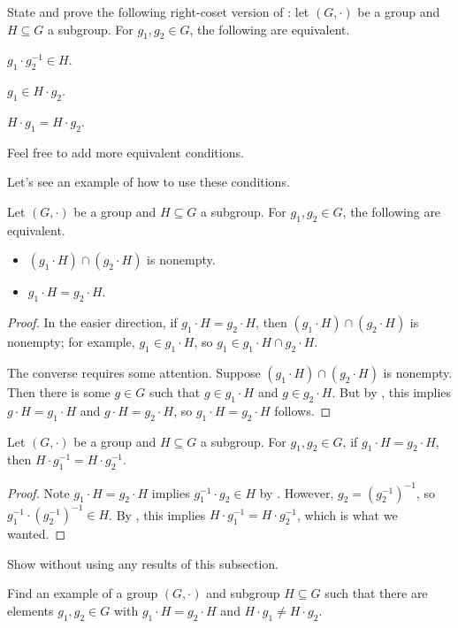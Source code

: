 \documentclass[../notes.tex]{subfiles}
\begin{document}
\begin{exe} \label{exe:how-to-right-coset}
    State and prove the following right-coset version of : let $(G,\cdot)$ be a group and $H\subseteq G$ a subgroup. For $g_1,g_2\in G$, the following are equivalent.
    \begin{listalph}
        \item $g_1\cdot g_2^{-1}\in H$.
        \item $g_1\in H\cdot g_2$.
        \item $H\cdot g_1=H\cdot g_2$.
    \end{listalph}
    Feel free to add more equivalent conditions.
\end{exe}
Let's see an example of how to use these conditions.
\begin{corollary} \label{cor:intersect-cosets}
    Let $(G,\cdot)$ be a group and $H\subseteq G$ a subgroup. For $g_1,g_2\in G$, the following are equivalent.
    \begin{itemize}
        \item $(g_1\cdot H)\cap(g_2\cdot H)$ is nonempty.
        \item $g_1\cdot H=g_2\cdot H$.
    \end{itemize}
\end{corollary}
\begin{proof}
    In the easier direction, if $g_1\cdot H=g_2\cdot H$, then $(g_1\cdot H)\cap(g_2\cdot H)$ is nonempty; for example, $g_1\in g_1\cdot H$, so $g_1\in g_1\cdot H\cap g_2\cdot H$.
    
    The converse requires some attention. Suppose $(g_1\cdot H)\cap (g_2\cdot H)$ is nonempty. Then there is some $g\in G$ such that $g\in g_1\cdot H$ and $g\in g_2\cdot H$. But by , this implies $g\cdot H=g_1\cdot H$ and $g\cdot H=g_2\cdot H$, so $g_1\cdot H=g_2\cdot H$ follows.
\end{proof}
\begin{corollary} \label{cor:left-to-right-coset}
    Let $(G,\cdot)$ be a group and $H\subseteq G$ a subgroup. For $g_1,g_2\in G$, if $g_1\cdot H=g_2\cdot H$, then $H\cdot g_1^{-1}=H\cdot g_2^{-1}$.
\end{corollary}
\begin{proof}
    Note $g_1\cdot H=g_2\cdot H$ implies $g_1^{-1}\cdot g_2\in H$ by . However, $g_2=\left(g_2^{-1}\right)^{-1}$, so $g_1^{-1}\cdot\left(g_2^{-1}\right)^{-1}\in H$. By , this implies $H\cdot g_1^{-1}=H\cdot g_2^{-1}$, which is what we wanted.
\end{proof}
\begin{exe}
    Show  without using any results of this subsection.
\end{exe}
\begin{exe}
    Find an example of a group $(G,\cdot)$ and subgroup $H\subseteq G$ such that there are elements $g_1,g_2\in G$ with $g_1\cdot H=g_2\cdot H$ and $H\cdot g_1\ne H\cdot g_2$.
\end{exe}
\end{document}
